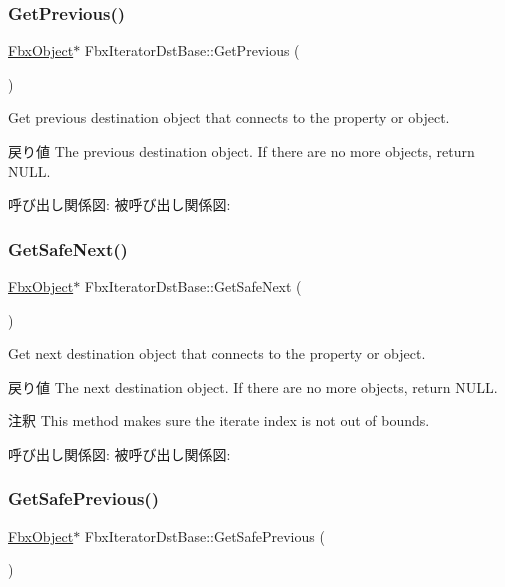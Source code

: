 \subsubsection{\texorpdfstring{Get\+Previous()}{GetPrevious()}}
{\footnotesize\ttfamily \hyperlink{class_fbx_object}{Fbx\+Object}$\ast$ Fbx\+Iterator\+Dst\+Base\+::\+Get\+Previous (\begin{DoxyParamCaption}{ }\end{DoxyParamCaption})}

Get previous destination object that connects to the property or object. \begin{DoxyReturn}{戻り値}
The previous destination object. If there are no more objects, return N\+U\+LL. 
\end{DoxyReturn}
呼び出し関係図\+:
被呼び出し関係図\+:
\mbox{\label{class_fbx_iterator_dst_base_a2107573dd3869f094ca35931ffc4b790}} 
\subsubsection{\texorpdfstring{Get\+Safe\+Next()}{GetSafeNext()}}
{\footnotesize\ttfamily \hyperlink{class_fbx_object}{Fbx\+Object}$\ast$ Fbx\+Iterator\+Dst\+Base\+::\+Get\+Safe\+Next (\begin{DoxyParamCaption}{ }\end{DoxyParamCaption})}

Get next destination object that connects to the property or object. \begin{DoxyReturn}{戻り値}
The next destination object. If there are no more objects, return N\+U\+LL. 
\end{DoxyReturn}
\begin{DoxyRemark}{注釈}
This method makes sure the iterate index is not out of bounds. 
\end{DoxyRemark}
呼び出し関係図\+:
被呼び出し関係図\+:
\mbox{\label{class_fbx_iterator_dst_base_af5526eefa90ef43e1a0daff1b8e8e3d3}} 
\subsubsection{\texorpdfstring{Get\+Safe\+Previous()}{GetSafePrevious()}}
{\footnotesize\ttfamily \hyperlink{class_fbx_object}{Fbx\+Object}$\ast$ Fbx\+Iterator\+Dst\+Base\+::\+Get\+Safe\+Previous (\begin{DoxyParamCaption}{ }\end{DoxyParamCaption})}


